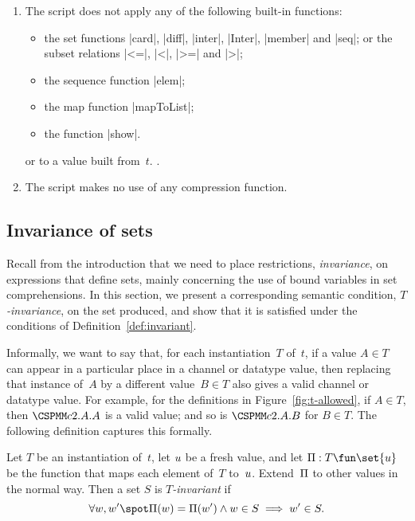 \begin{definition}
\begin{enumerate}
\item\label{item:built-in-functions} The script does not apply any of the
  following built-in functions:
  \begin{itemize}
    \item the set functions |card|, |diff|, |inter|, |Inter|, |member| and
      |seq|; or the subset relations |<=|, |<|, |>=| and |>|;

    \item the sequence function |elem|;

    \item the map function |mapToList|;

    \item the function |show|.
  \end{itemize}
   or  to a value built from~$t$.
  . 

\item The script makes no use of any compression function.
\end{enumerate}
\end{definition}


\subsection{Invariance of sets}

Recall from the introduction that we need to place restrictions,
\emph{invariance}, on expressions that define sets, mainly concerning the use
of bound variables in set comprehensions.  In this section, we present a
corresponding semantic condition, \emph{$T$-invariance}, on the set produced,
and show that it is satisfied under the conditions of
Definition~\ref{def:invariant}.

Informally, we want to say that, for each instantiation~$T$ of~$t$, if a value
$A \in T$ can appear in a particular place in a channel or datatype value,
then replacing that instance of~$A$ by a different value~$B \in T$ also gives
a valid channel or datatype value.  For example, for the definitions in
Figure~\ref{fig:t-allowed}, if $A \in T$, then $\M{c2}.A.A$ is a valid value;
and so is $\M{c2}.A.B$ for $B \in T$.  The following definition captures this
formally.
%
\begin{definition}
Let $T$ be an instantiation of~$t$, let $u$ be a fresh value, and let
$\unitf : T \fun \set{\unit}$ be the function that maps each element of~$T$
to~$u$. Extend~$\Pi$ to other values in the normal way.  Then a set $S$
is \emph{$T$-invariant} if
\[
\forall w, w' \spot
  \unitf(w) = \unitf(w') \land w \in S  \implies w' \in S.
\]
\end{definition}

